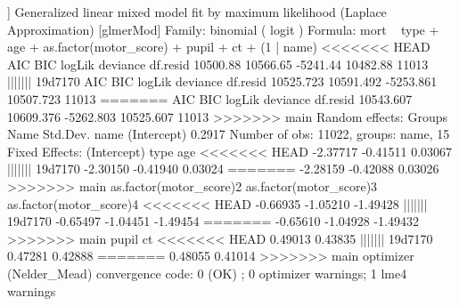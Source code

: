 \documentclass[
]{jss}
\begin{document}
\begin{CodeChunk}
\begin{CodeOutput}
[[2]]
Generalized linear mixed model fit by maximum likelihood (Laplace
  Approximation) [glmerMod]
 Family: binomial  ( logit )
Formula: mort ~ type + age + as.factor(motor_score) + pupil + ct + (1 |  
    name)
<<<<<<< HEAD
     AIC      BIC   logLik deviance df.resid 
10500.88 10566.65 -5241.44 10482.88    11013 
||||||| 19d7170
      AIC       BIC    logLik  deviance  df.resid 
10525.723 10591.492 -5253.861 10507.723     11013 
=======
      AIC       BIC    logLik  deviance  df.resid 
10543.607 10609.376 -5262.803 10525.607     11013 
>>>>>>> main
Random effects:
 Groups Name        Std.Dev.
 name   (Intercept) 0.2917  
Number of obs: 11022, groups:  name, 15
Fixed Effects:
            (Intercept)                     type                      age  
<<<<<<< HEAD
               -2.37717                 -0.41511                  0.03067  
||||||| 19d7170
               -2.30150                 -0.41940                  0.03024  
=======
               -2.28159                 -0.42088                  0.03026  
>>>>>>> main
as.factor(motor_score)2  as.factor(motor_score)3  as.factor(motor_score)4  
<<<<<<< HEAD
               -0.66935                 -1.05210                 -1.49428  
||||||| 19d7170
               -0.65497                 -1.04451                 -1.49454  
=======
               -0.65610                 -1.04928                 -1.49432  
>>>>>>> main
                  pupil                       ct  
<<<<<<< HEAD
                0.49013                  0.43835  
||||||| 19d7170
                0.47281                  0.42888  
=======
                0.48055                  0.41014  
>>>>>>> main
optimizer (Nelder_Mead) convergence code: 0 (OK) ; 0 optimizer warnings; 1 lme4 warnings 


\end{CodeOutput}
\end{CodeChunk}
\end{document}
